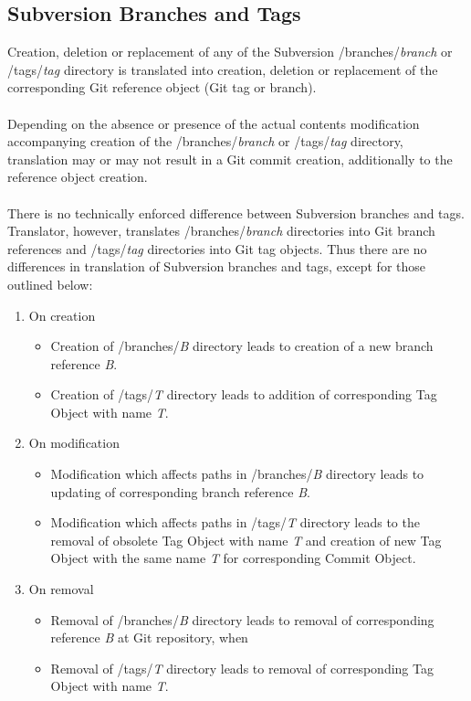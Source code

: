 \subsection{Subversion Branches and Tags}
\renewcommand{\figurename}{Diagram}

Creation, deletion or replacement of any of the Subversion /branches/\emph{branch} or /tags/\emph{tag} directory
is translated into creation, deletion or replacement of the corresponding Git reference object (Git tag or branch). 
\\\\
Depending on the absence or presence of the actual contents modification accompanying creation of the /branches/\emph{branch} 
or /tags/\emph{tag} directory, translation may or may not result in a Git commit creation, additionally 
to the reference object creation.
\\\\
There is no technically enforced difference between Subversion branches and tags. Translator, however, translates
/branches/\emph{branch} directories into Git branch references and /tags/\emph{tag} directories into Git tag objects.
Thus there are no differences in translation of Subversion branches and tags, except for those outlined below:
\begin{enumerate}
	\compactlist
	\item On creation
	\begin{itemize}
		\item Creation of /branches/\emph{B} directory leads to creation of a new branch reference \emph{B}.
		\item Creation of /tags/\emph{T} directory leads to addition of corresponding Tag Object with name \emph{T}.
	\end{itemize}
	\item On modification
	\begin{itemize}
		\item Modification which affects paths in /branches/\emph{B} directory leads to updating of corresponding branch reference \emph{B}.
		\item Modification which affects paths in /tags/\emph{T} directory leads to the removal of obsolete Tag Object with name \emph{T} and creation of new Tag Object with the same name \emph{T} for corresponding Commit Object.
	\end{itemize}
	\item On removal
	\begin{itemize}
		\item Removal of /branches/\emph{B} directory leads to removal of corresponding reference \emph{B} at Git repository, when
		\item Removal of /tags/\emph{T} directory leads to removal of corresponding Tag Object with name \emph{T}.
	\end{itemize}
\end{enumerate}
